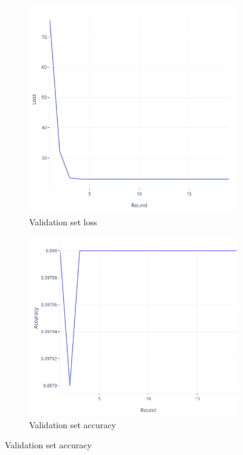 \documentclass[12pt]{article}
\begin{document}
\begin{figure}[hbt!]
\begin{subfigure}{.475\linewidth}
  \includegraphics[width=\linewidth]{loss}
  \caption{Validation set loss}
  \label{fig:loss}
\end{subfigure}\hfill
\begin{subfigure}{.475\linewidth}
  \includegraphics[width=\linewidth]{accuracy}
  \caption{Validation set accuracy}
  \label{fig:accuracy}
\end{subfigure}


\end{figure}
\end{document}
